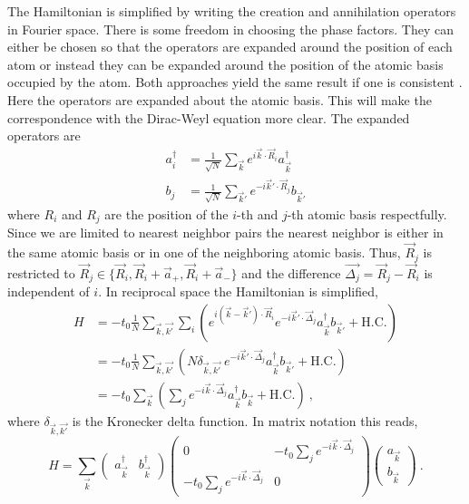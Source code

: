 The Hamiltonian is simplified by writing the creation and annihilation operators in Fourier space.
There is some freedom in choosing the phase factors.
They can either be chosen so that the operators are expanded around the position of each atom or instead they can be expanded around the position of the atomic basis occupied by the atom.
Both approaches yield the same result if one is consistent \cite{Bena2009}.
Here the operators are expanded about the atomic basis.
This will make the correspondence with the Dirac-Weyl equation more clear.
The expanded operators are
\begin{align}
	a_i^{\dagger}&=\frac{1}{\sqrt{N}}\sum_{\vec{k} } e^{ i \vec{k}  \cdot \vec{R}_i} a_{\vec{k} }^{\dagger} \nonumber \\
	b_j          &=\frac{1}{\sqrt{N}}\sum_{\vec{k}'} e^{-i \vec{k}' \cdot \vec{R}_j} b_{\vec{k}'} \label{eq:TB:FT} 
\end{align}
where $R_i$ and $R_j$ are the position of the $i$-th and $j$-th atomic basis respectfully.  
Since we are limited to nearest neighbor pairs the nearest neighbor is either in the same atomic basis or in one of the neighboring atomic basis.
Thus, $\vec{R}_j$ is restricted to $\vec{R}_j \in \{ \vec{R}_i,\vec{R}_i+\vec{a}_+,\vec{R}_i+\vec{a}_-\}$ and the difference $\vec{\Delta_j}=\vec{R}_j-\vec{R}_i$ is independent of $i$.
In reciprocal space the Hamiltonian is simplified,
\begin{align}
	H&=-t_0 \frac{1}{N} \sum_{\vec{k},\vec{k'}}\sum_i \left( e^{i (\vec{k}-\vec{k}') \cdot \vec{R}_i}
		e^{-i \vec{k}' \cdot \vec{\Delta}_j}
		a^{\dagger}_{\vec{k}} b_{\vec{k}'} + \text{H.C.} \right) \nonumber \\
	 &=-t_0 \frac{1}{N} \sum_{\vec{k},\vec{k'}} \left( N \delta_{\vec{k},\vec{k'}} \
	 	e^{-i \vec{k}' \cdot \vec{\Delta}_j}
		a^{\dagger}_{\vec{k}} b_{\vec{k}'} + \text{H.C.}\right) \nonumber \\ 
	 &=-t_0 \sum_{\vec{k}}\left( \sum_{j} e^{-i \vec{k} \cdot \vec{\Delta}_j} a^{\dagger}_{\vec{k}} b_{\vec{k}} + \text{H.C.} \right) \label{eq:TB:FTing}\ ,
\end{align}
where $\delta_{\vec{k},\vec{k'}}$ is the Kronecker delta function.
In matrix notation this reads,
\begin{equation}
	H=\sum_{\vec k} 
		\left( \begin{array}{cc} a^{\dagger}_{\vec{k}} & b^{\dagger}_{\vec{k}} \end{array} \right)
		\left( \begin{array}{cc}
			0              & -t_0 \sum_{j} e^{-i \vec{k} \cdot \vec{\Delta}_j} \\
			-t_0 \sum_{j} e^{-i \vec{k} \cdot \vec{\Delta}_j} & 0               \end{array} \right)
		\left( \begin{array}{c } a_{\vec{k}}           \\ b_{\vec{k}}          \end{array} \right) \ .
	\label{eq:TB:RealSpace}
\end{equation}
